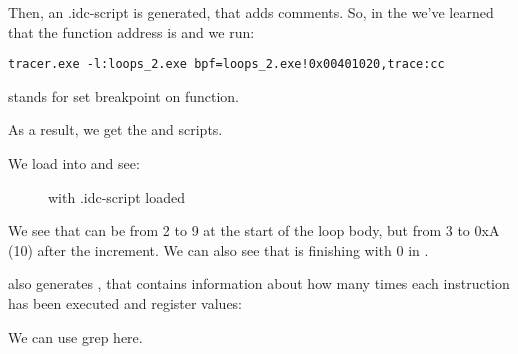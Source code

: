 Then, an \IDA .idc-script is generated, that adds comments.
So, in the \IDA we've learned that the \main function address is  and we run:

\begin{lstlisting}
tracer.exe -l:loops_2.exe bpf=loops_2.exe!0x00401020,trace:cc
\end{lstlisting}

 stands for set breakpoint on function.

As a result, we get the  and  scripts.

\clearpage
We load  into \IDA and see:

\begin{figure}[H]
\centering
{}
\caption{\IDA with .idc-script loaded}
\label{fig:loops_IDA_tracer}
\end{figure}

We see that \ESI can be from 2 to 9 at the start of the loop body,
but from 3 to 0xA (10) after the increment.
We can also see that \main is finishing with 0 in \EAX.

\tracer also generates , 
that contains information about how many times each instruction has been executed and
register values:


\myindex{\GrepUsage}
We can use grep here.

